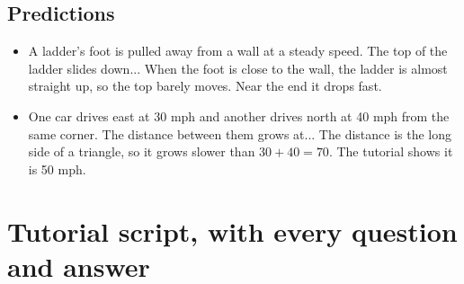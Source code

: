 \documentclass[11pt]{article}
\begin{document}
\subsection*{Predictions}\begin{itemize}
\item A ladder's foot is pulled away from a wall at a steady speed. The top of the ladder slides down...  When the foot is close to the wall, the ladder is almost straight up, so the top barely moves. Near the end it drops fast.
\item One car drives east at 30 mph and another drives north at 40 mph from the same corner. The distance between them grows at...  The distance is the long side of a triangle, so it grows slower than $30+40=70$. The tutorial shows it is 50 mph.
\end{itemize}
\section*{Tutorial script, with every question and answer}
\end{document}
